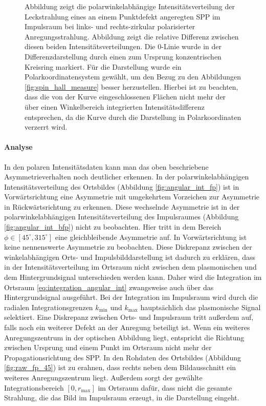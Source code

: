 \documentclass[titlepage,  ngerman]{article}
\begin{document}
\begin{figure}[h]
			\caption[Polarwinkel Auswertung Impulsraum]{Abbildung  zeigt die polarwinkelabhängige Intensitätsverteilung der Leckstrahlung eines an einem Punktdefekt angeregten SPP im Impulsraum bei links- und rechts-zirkular polarisierter Anregungsstrahlung. Abbildung  zeigt die relative Differenz zwischen diesen beiden Intensitätsverteilungen. Die $0$-Linie wurde in der Differenzdarstellung durch einen zum Ursprung konzentrischen Kreisring markiert. Für die Darstellung wurde ein Polarkoordinatensystem gewählt, um den Bezug zu den Abbildungen \ref{fig:spin_hall_measure} besser herzustellen. Hierbei ist zu beachten, dass die von der Kurve eingeschlossenen Flächen nicht mehr der über einen Winkelbereich integrierten Intensitätsdifferenz entsprechen, da die Kurve durch die Darstellung in Polarkoordinaten verzerrt wird.}
			\label{fig:angular_dist_bfp}
		\end{figure}
		\paragraph{Analyse}
		In den polaren Intensitätsdaten kann man das oben beschriebene Asymmetrieverhalten noch deutlicher erkennen. In der polarwinkelabhängigen Intensitätsverteilung des Ortsbildes (Abbildung \ref{fig:angular_int_fp}) ist in Vorwärtsrichtung eine Asymmetrie mit umgekehrtem Vorzeichen zur Asymmetrie in Rückwärtsrichtung zu erkennen. Diese wechselnde Asymmetrie ist in der polarwinkelabhängigen Intensitätsverteilung des Impulsraumes (Abbildung \ref{fig:angular_int_bfp}) nicht zu beobachten. Hier tritt in dem Bereich $\phi \in [45^\circ, 315^\circ]$ eine gleichbleibende Asymmetrie auf. In Vorwärtsrichtung ist keine nennenswerte Asymmetrie zu beobachten. Diese Diskrepanz zwischen der winkelabhängigen Orts- und Impulsbilddarstellung ist dadurch zu erklären, dass in der Intensitätsverteilung im Ortsraum nicht zwischen dem plasmonischen und dem Hintergrundsignal unterschieden werden kann. Daher wird die Integration im Ortsraum \eqref{eq:integration_angular_int} zwangsweise auch über das Hintergrundsignal ausgeführt. Bei der Integration im Impulsraum wird durch die radialen Integrationsgrenzen $k_\mathrm{min}$ und $k_\mathrm{max}$ hauptsächlich das plasmonische Signal selektiert. Eine Diskrepanz zwischen Orts- und Impulsraum tritt außerdem auf, falls noch ein weiterer Defekt an der Anregung beteiligt ist. Wenn ein weiteres Anregungszentrum in der optischen Abbildung liegt, entspricht die Richtung zwischen Ursprung und einem Punkt im Ortsraum nicht mehr der Propagationsrichtung des SPP. In den Rohdaten des Ortsbildes (Abbildung \ref{fig:raw_fp_45}) ist zu erahnen, dass rechts neben dem Bildausschnitt ein weiteres Anregungszentrum liegt. Außerdem sorgt der gewählte Integrationsbereich $[0, r_\mathrm{max}]$ im Ortsraum dafür, dass nicht die gesamte Strahlung, die das Bild im Impulsraum erzeugt, in die Darstellung eingeht.
		
\end{document}

